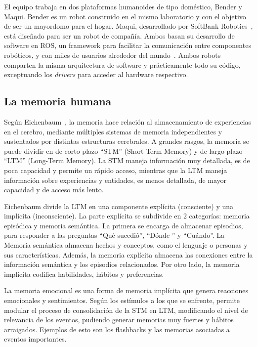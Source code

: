 El equipo trabaja en dos plataformas humanoides de tipo doméstico, Bender y Maqui. Bender es un robot construido en el mismo laboratorio y con el objetivo de ser un mayordomo para el hogar. Maqui, desarrollado por SoftBank Robotics~\cite{softbank}, está diseñado para ser un robot de compañía. Ambos basan su desarrollo de software en ROS, un framework para facilitar la comunicación entre componentes robóticos, y con miles de usuarios alrededor del mundo~\cite{ROS:2009}. Ambos robots comparten la misma arquitectura de software y prácticamente todo su código, exceptuando los \textit{drivers} para acceder al hardware respectivo. 


\subsection{La memoria humana}

Según Eichenbaum~\cite{Eichenbaum:2008}, la memoria hace relación al almacenamiento de experiencias en el cerebro, mediante múltiples sistemas de memoria independientes y sustentados por distintas estructuras cerebrales. A grandes rasgos, la memoria se puede dividir en de corto plazo ``STM'' (Short-Term Memory) y de largo plazo ``LTM'' (Long-Term Memory). La STM maneja información muy detallada, es de poca capacidad y permite un rápido acceso, mientras que la LTM maneja información sobre experiencias y entidades, es menos detallada, de mayor capacidad y de acceso más lento.

Eichenbaum divide la LTM en una componente explícita (consciente) y una implícita (inconsciente). La parte explícita se subdivide en 2 categorías: memoria episódica y memoria semántica. La primera se encarga de almacenar episodios, para responder a las preguntas ``Qué sucedió'', ``Dónde '' y ``Cuándo''. La Memoria semántica almacena hechos y conceptos, como el lenguaje o personas y sus características. Además, la memoria explícita  almacena las conexiones entre la información semántica y los episodios relacionados. Por otro lado, la memoria implícita codifica habilidades, hábitos y preferencias.

La memoria emocional es una forma de memoria implícita que genera reacciones emocionales y sentimientos. Según los estímulos a los que se enfrente, permite modular el proceso de consolidación de la STM en LTM, modificando el nivel de relevancia de los eventos, pudiendo generar memorias muy fuertes y hábitos arraigados. Ejemplos de esto son los flashbacks y las memorias asociadas a eventos importantes.

